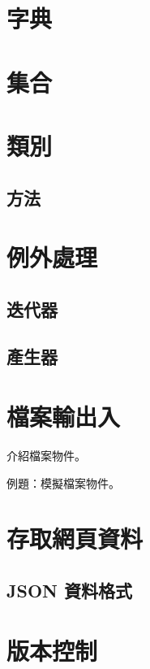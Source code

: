 \documentclass[a4paper,12pt]{book}
\theoremstyle{definition}
\begin{document}
\chapter{字典}
%
\label{c:dict}

\chapter{集合}
%
\label{c:set}

\chapter{類別}
%
\label{c:class}

\section{方法}

\chapter{例外處理}
%
\label{c:exception}

\section{迭代器}

\section{產生器}

\chapter{檔案輸出入}
%
\label{c:file}

介紹檔案物件。

例題：模擬檔案物件。

\chapter{存取網頁資料}
%
\label{c:web}

\section{JSON 資料格式}

\chapter{版本控制}
%
\label{c:version}
\end{document}

